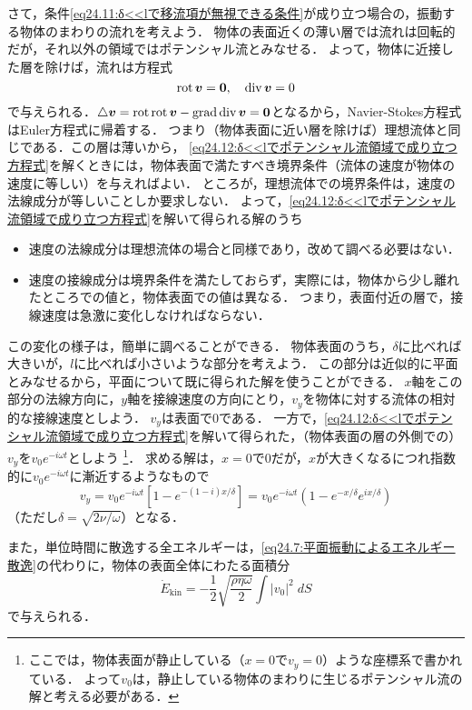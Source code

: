 さて，条件\eqref{eq24.11:δ<<lで移流項が無視できる条件}が成り立つ場合の，振動する物体のまわりの流れを考えよう．
物体の表面近くの薄い層では流れは回転的だが，それ以外の領域ではポテンシャル流とみなせる．
よって，物体に近接した層を除けば，流れは方程式
\begin{equation}\label{eq24.12:δ<<lでポテンシャル流領域で成り立つ方程式}
    \operatorname{rot}\vb*{v}=\vb*{0}, \quad \operatorname{div}\vb*{v}=0
\end{equation}
で与えられる．$\triangle\vb*{v}=\operatorname{rot}\operatorname{rot}\vb*{v} - \operatorname{grad}\operatorname{div}\vb*{v}=\vb*{0}$となるから，Navier-Stokes方程式はEuler方程式に帰着する．
つまり（物体表面に近い層を除けば）理想流体と同じである．この層は薄いから，
\eqref{eq24.12:δ<<lでポテンシャル流領域で成り立つ方程式}を解くときには，物体表面で満たすべき境界条件（流体の速度が物体の速度に等しい）を与えればよい．
ところが，理想流体での境界条件は，速度の法線成分が等しいことしか要求しない．
よって，\eqref{eq24.12:δ<<lでポテンシャル流領域で成り立つ方程式}を解いて得られる解のうち
\begin{itemize}
    \item 速度の法線成分は理想流体の場合と同様であり，改めて調べる必要はない．
    \item 速度の接線成分は境界条件を満たしておらず，実際には，物体から少し離れたところでの値と，物体表面での値は異なる．
    つまり，表面付近の層で，接線速度は急激に変化しなければならない．
\end{itemize}
この変化の様子は，簡単に調べることができる．
物体表面のうち，$\delta$に比べれば大きいが，$l$に比べれば小さいような部分を考えよう．
この部分は近似的に平面とみなせるから，平面について既に得られた解を使うことができる．
$x$軸をこの部分の法線方向に，$y$軸を接線速度の方向にとり，$v_y$を物体に対する流体の相対的な接線速度としよう．
$v_y$は表面で0である．
一方で，\eqref{eq24.12:δ<<lでポテンシャル流領域で成り立つ方程式}を解いて得られた，（物体表面の層の外側での）$v_y$を$v_0 e^{-i\omega t}$としよう
\footnote{ここでは，物体表面が静止している（$x=0$で$v_y=0$）ような座標系で書かれている．
よって$v_0$は，静止している物体のまわりに生じるポテンシャル流の解と考える必要がある．}．
求める解は，$x=0$で0だが，$x$が大きくなるにつれ指数的に$v_0 e^{-i\omega t}$に漸近するようなもので
\begin{equation}
    v_y = v_0 e^{-i\omega t} \left[ 1 - e^{-(1-i)x/\delta} \right]
    = v_0 e^{-i\omega t} \left( 1 - e^{-x/\delta}e^{ix/\delta} \right)
\end{equation}
（ただし$\delta=\sqrt{2\nu/\omega}$）となる．

また，単位時間に散逸する全エネルギーは，\eqref{eq24.7:平面振動によるエネルギー散逸}の代わりに，物体の表面全体にわたる面積分
\begin{equation}\label{eq24.14:任意の物体が振動するときのエネルギー散逸}
    \dot{E}_\mathrm{kin} = - \frac{1}{2} \sqrt{\frac{\rho\eta\omega}{2}} \int |v_0|^2 \; dS 
\end{equation}
で与えられる．




